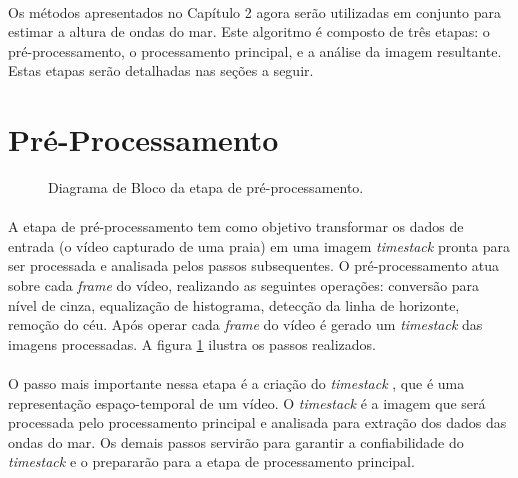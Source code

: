\newcommand{\timestack}[0]{\textit{timestack} }
\newcommand{\threshold}[0]{\textit{threshold} }

\paragraph{}Os métodos apresentados no Capítulo 2 agora serão utilizadas em conjunto para estimar a altura de ondas do mar. Este algoritmo é composto de três etapas: o pré-processamento, o processamento principal, e a análise da imagem resultante. Estas etapas serão detalhadas nas seções a seguir.

\section{Pré-Processamento}

\begin{figure}[h]
  \qquad
  \caption[\small{Diagrama de Bloco da etapa de pré-processamento.}]{\small{Diagrama de Bloco da etapa de pré-processamento.}}
  \label{FigDiagramaPreProc}
\end{figure}

\paragraph{}A etapa de pré-processamento tem como objetivo transformar os dados de entrada (o vídeo capturado de uma praia) em uma imagem \timestack  pronta para ser processada e analisada pelos passos subsequentes. O pré-processamento atua sobre cada \textit{frame} do vídeo, realizando as seguintes operações: conversão para nível de cinza, equalização de histograma, detecção da linha de horizonte, remoção do céu. Após operar cada \textit{frame} do vídeo é gerado um \timestack das imagens processadas. A figura \ref{FigDiagramaPreProc} ilustra os passos realizados.

\paragraph{}O passo mais importante nessa etapa é a criação do \timestack, que é uma representação espaço-temporal de um vídeo. O \timestack é a imagem que será processada pelo processamento principal e analisada para extração dos dados das ondas do mar. Os demais passos servirão para garantir a confiabilidade do \timestack e o prepararão para a etapa de processamento principal.

